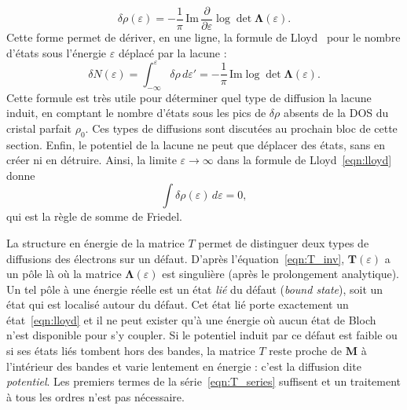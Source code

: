 \begin{equation}
    \delta\rho(\varepsilon) = -\frac{1}{\pi}\,\mathrm{Im}\,\frac{\partial}{\partial\varepsilon}\log\det\bm\Lambda(\varepsilon).\label{eqn:rho_det}
\end{equation}
Cette forme permet de dériver, en une ligne, la formule de Lloyd~\cite{lloydWavePropagationAssembly1967} pour le nombre d'états sous l'énergie $\varepsilon$ déplacé par la lacune :
\begin{equation}
        \delta N(\varepsilon) = \int_{-\infty}^{\varepsilon}\delta\rho\,d\varepsilon' = -\frac{1}{\pi}\,\mathrm{Im}\log\det\bm\Lambda(\varepsilon).\label{eqn:lloyd}
\end{equation}
Cette formule est très utile pour déterminer quel type de diffusion la lacune induit, en comptant le nombre d'états sous les pics de $\delta\rho$ absents de la DOS du cristal parfait $\rho_0$. Ces types de diffusions sont discutées au prochain bloc de cette section. Enfin, le potentiel de la lacune ne peut que déplacer des états, sans en créer ni en détruire. Ainsi, la limite $\varepsilon\to\infty$ dans la formule de Lloyd~\eqref{eqn:lloyd} donne
\begin{equation}
    \int\delta\rho(\varepsilon)\,d\varepsilon = 0,\label{eqn:friedel}
\end{equation}
qui est la règle de somme de Friedel.

\bigskip
{}

La structure en énergie de la matrice $T$ permet de distinguer deux types de diffusions des électrons sur un défaut. D'après l'équation~\eqref{eqn:T_inv}, $\bm T(\varepsilon)$ a un pôle là où la matrice $\bm\Lambda(\varepsilon)$ est singulière (après le prolongement analytique). Un tel pôle à une énergie réelle est un état \textit{lié} du défaut (\textit{bound state}), soit un état qui est localisé autour du défaut. Cet état lié porte exactement un état~\eqref{eqn:lloyd} et il ne peut exister qu'à une énergie où aucun état de Bloch n'est disponible pour s'y coupler. Si le potentiel induit par ce défaut est faible ou si ses états liés tombent hors des bandes, la matrice $T$ reste proche de $\bm M$ à l'intérieur des bandes et varie lentement en énergie : c'est la diffusion dite \textit{potentiel}. Les premiers termes de la série~\eqref{eqn:T_series} suffisent et un traitement à tous les ordres n'est pas nécessaire.

